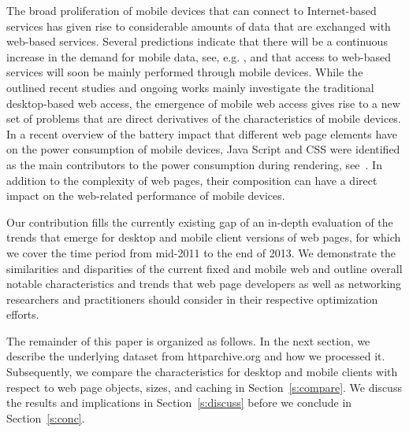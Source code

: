 The broad proliferation of mobile devices that can connect to Internet-based services has given rise to considerable amounts of data that are exchanged with web-based services. 
Several predictions indicate that there will be a continuous increase in the demand for mobile data, see, e.g. \cite{Ci13}, and that access to web-based services will soon be mainly performed through mobile devices.
While the outlined recent studies and ongoing works mainly investigate the traditional desktop-based web access, the emergence of mobile web access gives rise to a new set of problems that are direct derivatives of the characteristics of mobile devices.
In a recent overview of the battery impact that different web page elements have on the power consumption of mobile devices, Java Script and CSS were identified as the main contributors to the power consumption during rendering, see~\cite{ThAgNiBoSi12}.
In addition to the complexity of web pages, their composition can have a direct impact on the web-related performance of mobile devices.

Our contribution fills the currently existing gap of an in-depth evaluation of the trends that emerge for desktop and mobile client versions of web pages, for which we cover the time period from mid-2011 to the end of 2013.
We demonstrate the similarities and disparities of the current fixed and mobile web and outline overall notable characteristics and trends that web page developers as well as networking researchers and practitioners should consider in their respective optimization efforts.

The remainder of this paper is organized as follows. 
In the next section, we describe the underlying dataset from httparchive.org and how we processed it.
Subsequently, we compare the characteristics for desktop and mobile clients with respect to web page objects, sizes, and caching in Section~\ref{s:compare}.
We discuss the results and implications in Section~\ref{s:discuss} before we conclude in Section~\ref{s:conc}.



